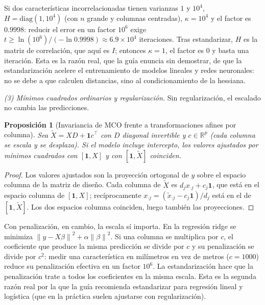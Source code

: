 \documentclass[11pt]{article}
\newtheorem{proposicion}[teorema]{Proposición}
\theoremstyle{definition}
\theoremstyle{remark}
\newcommand{\R}{\mathbb{R}}
\newcommand{\norm}[1]{\left\lVert #1\right\rVert}
\begin{document}
\noindent Si dos características incorrelacionadas tienen varianzas $1$ y $10^4$, $H=\mathrm{diag}(1,10^4)$ (con $n$ grande y columnas centradas), $\kappa=10^4$ y el factor es $0.9998$: reducir el error en un factor $10^6$ exige $t\ge\ln(10^6)/(-\ln0.9998)\approx6.9\times10^4$ iteraciones. Tras estandarizar, $H$ es la matriz de correlación, que aquí es $I$; entonces $\kappa=1$, el factor es $0$ y basta una iteración. Esta es la razón real, que la guía enuncia sin demostrar, de que la estandarización acelere el entrenamiento de modelos lineales y redes neuronales: no se debe a que calculen distancias, sino al condicionamiento de la hessiana.

\medskip

\noindent \emph{(3) Mínimos cuadrados ordinarios y regularización.} Sin regularización, el escalado no cambia las predicciones.

\begin{proposicion}[Invariancia de MCO frente a transformaciones afines por columna]\label{prop:mco-inv}
\noindent Sea $\tilde X=XD+\mathbf{1}c^\top$ con $D$ diagonal invertible y $c\in\R^p$ (cada columna se escala y se desplaza). Si el modelo incluye intercepto, los valores ajustados por mínimos cuadrados con $[\mathbf 1,X]$ y con $[\mathbf 1,\tilde X]$ coinciden.
\end{proposicion}
\begin{proof}
\noindent Los valores ajustados son la proyección ortogonal de $y$ sobre el espacio columna de la matriz de diseño. Cada columna de $\tilde X$ es $d_jx_{\cdot j}+c_j\mathbf 1$, que está en el espacio columna de $[\mathbf 1,X]$; recíprocamente $x_{\cdot j}=(\tilde x_{\cdot j}-c_j\mathbf 1)/d_j$ está en el de $[\mathbf 1,\tilde X]$. Los dos espacios columna coinciden, luego también las proyecciones.
\end{proof}

\noindent Con penalización, en cambio, la escala sí importa. En la regresión ridge se minimiza $\norm{y-X\beta}^2+\alpha\norm{\beta}^2$. Si una columna se multiplica por $c$, el coeficiente que produce la misma predicción se divide por $c$ y su penalización se divide por $c^2$: medir una característica en milímetros en vez de metros ($c=1000$) reduce su penalización efectiva en un factor $10^6$. La estandarización hace que la penalización trate a todos los coeficientes en la misma escala. Esta es la segunda razón real por la que la guía recomienda estandarizar para regresión lineal y logística (que en la práctica suelen ajustarse con regularización).
\end{document}
